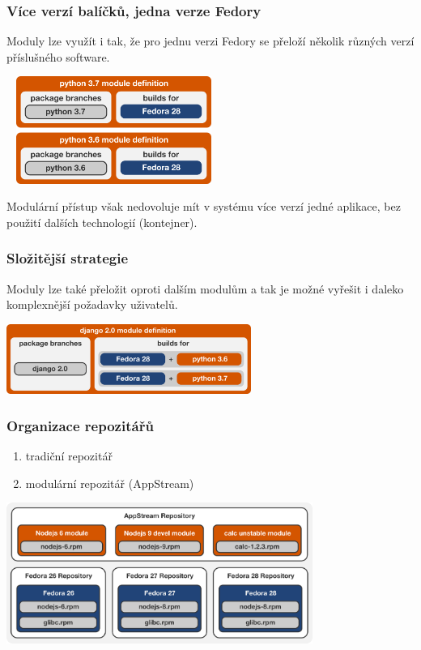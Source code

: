 \documentclass[12pt]{beamer}
\begin{document}
\begin{frame}
\frametitle{Více verzí balíčků, jedna verze Fedory}
Moduly lze využít i tak, že pro jednu verzi Fedory se přeloží několik různých verzí příslušného software.

\begin{center}
	\includegraphics[width=7cm, height=3.5cm]{multiversion}
\end{center}

Modulární přístup však nedovoluje mít v systému více verzí jedné aplikace, bez použití dalších technologií (kontejner).

\end{frame}

\begin{frame}
\frametitle{Složitější strategie}
Moduly lze také přeložit oproti dalším modulům a tak je možné vyřešit i daleko komplexnější požadavky uživatelů.

\begin{center}
	\includegraphics[width=8cm]{combined}
\end{center}
\end{frame}

\begin{frame}
\frametitle{Organizace repozitářů}

\begin{enumerate}
	\item tradiční repozitář
	\item modulární repozitář (AppStream)
\end{enumerate}

\begin{center}
	\includegraphics[width=10cm]{repos}
\end{center}
\end{frame}
\end{document}
